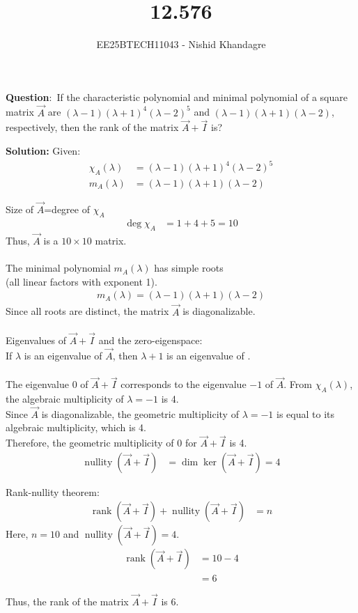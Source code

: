\documentclass[journal]{IEEEtran}
\title{12.576}
\author{EE25BTECH11043 - Nishid Khandagre}
\begin{document}
\maketitle

\renewcommand{\thefigure}{\theenumi}
\renewcommand{\thetable}{\theenumi}


\textbf{Question}:\
If the characteristic polynomial and minimal polynomial of a square matrix $\vec{A}$ are $(\lambda-1)(\lambda+1)^4(\lambda-2)^5$ and $(\lambda-1)(\lambda+1)(\lambda-2)$, respectively, then the rank of the matrix $\vec{A}+\vec{I}$ is?

\textbf{Solution: }
Given:
\begin{align}
\chi_A(\lambda) &= (\lambda-1)(\lambda+1)^4(\lambda-2)^5 \\
m_A(\lambda) &= (\lambda-1)(\lambda+1)(\lambda-2)
\end{align}

Size of $\vec{A}$=degree of $\chi_A$
\begin{align}
\deg\chi_A &= 1+4+5 = 10
\end{align}
Thus, $\vec{A}$ is a $10 \times 10$ matrix.\\\\
The minimal polynomial $m_A(\lambda)$ has simple roots \\(all linear factors with exponent 1).
\begin{align}
m_A(\lambda) = (\lambda-1)(\lambda+1)(\lambda-2)
\end{align}
Since all roots are distinct, the matrix $\vec{A}$ is diagonalizable.\\\\

Eigenvalues of $\vec{A}+\vec{I}$ and the zero-eigenspace:\\

If $\lambda$ is an eigenvalue of $\vec{A}$, then $\lambda+1$ is an eigenvalue of .\\\\
The eigenvalue 0 of $\vec{A}+\vec{I}$ corresponds to the eigenvalue $-1$ of $\vec{A}$.
From $\chi_A(\lambda)$, the algebraic multiplicity of $\lambda=-1$ is 4.\\
Since $\vec{A}$ is diagonalizable, the geometric multiplicity of $\lambda=-1$ is equal to its algebraic multiplicity, which is 4.\\
Therefore, the geometric multiplicity of 0 for $\vec{A}+\vec{I}$ is 4.
\begin{align}
\operatorname{nullity}(\vec{A}+\vec{I}) &= \dim\ker(\vec{A}+\vec{I}) = 4
\end{align}

Rank-nullity theorem:
\begin{align}
\operatorname{rank}(\vec{A}+\vec{I}) + \operatorname{nullity}(\vec{A}+\vec{I}) &= n
\end{align}
Here, $n=10$ and $\operatorname{nullity}(\vec{A}+\vec{I})=4$.
\begin{align}
\operatorname{rank}(\vec{A}+\vec{I}) &= 10 - 4 \\
&= 6
\end{align}

Thus, the rank of the matrix $\vec{A}+\vec{I}$ is 6.
\end{document}
